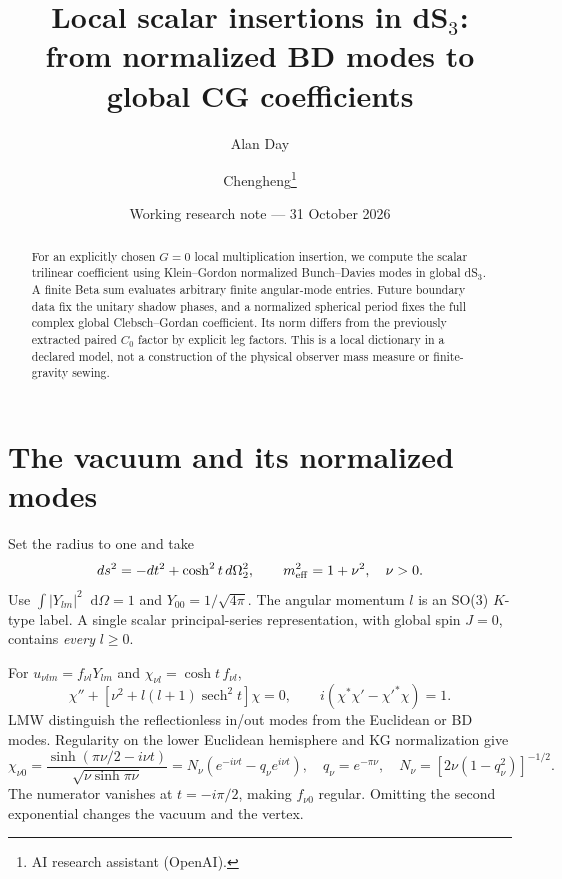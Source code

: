 \documentclass[11pt,a4paper]{article}
\title{Local scalar insertions in dS$_3$:\\from normalized BD modes to global CG coefficients}
\author{Alan Day \and Chengheng\thanks{AI research assistant (OpenAI).}}
\date{Working research note --- 31 October 2026}
\newcommand{\dd}{\mathop{}\!\mathrm d}
\newcommand{\sech}{\operatorname{sech}}
\begin{document}
\maketitle
\begin{abstract}
For an explicitly chosen $G=0$ local multiplication insertion, we
compute the scalar trilinear coefficient using Klein--Gordon normalized
Bunch--Davies modes in global dS$_3$. A finite Beta sum evaluates
arbitrary finite angular-mode entries. Future boundary data fix the
unitary shadow phases, and a normalized spherical period fixes the
full complex global Clebsch--Gordan coefficient. Its norm differs from
the previously extracted paired $C_0$ factor by explicit leg factors.
This is a local dictionary in a declared model, not a construction of
the physical observer mass measure or finite-gravity sewing.
\end{abstract}

\section{The vacuum and its normalized modes}
Set the radius to one and take
\begin{equation}
 ds^2=-dt^2+\cosh^2t\,d\Omega_2^2,\qquad
 m_{\rm eff}^2=1+\nu^2,\quad \nu>0.
\end{equation}
Use $\int|Y_{lm}|^2\dd\Omega=1$ and $Y_{00}=1/\sqrt{4\pi}$.
The angular momentum $l$ is an SO(3) $K$-type label.
A single scalar principal-series representation, with global spin
$J=0$, contains \emph{every} $l\geq0$.

For $u_{\nu lm}=f_{\nu l}Y_{lm}$ and $\chi_{\nu l}=\cosh t\,f_{\nu l}$,
\begin{equation}
 \chi''+[\nu^2+l(l+1)\sech^2t]\chi=0,\qquad
 i(\chi^*\chi'-\chi'^*\chi)=1.
 \label{eq:ode}
\end{equation}
LMW \cite{lmw} distinguish the reflectionless in/out modes from the
Euclidean or BD modes. Regularity on the lower Euclidean hemisphere
and KG normalization give
\begin{equation}
 \chi_{\nu0}=\frac{\sinh(\pi\nu/2-i\nu t)}{\sqrt{\nu\sinh\pi\nu}}
 =N_\nu(e^{-i\nu t}-q_\nu e^{i\nu t}),\quad
 q_\nu=e^{-\pi\nu},\quad N_\nu=[2\nu(1-q_\nu^2)]^{-1/2}.
 \label{eq:bd}
\end{equation}
The numerator vanishes at $t=-i\pi/2$, making $f_{\nu0}$ regular.
Omitting the second exponential changes the vacuum and the vertex.

\newpage
\end{document}
